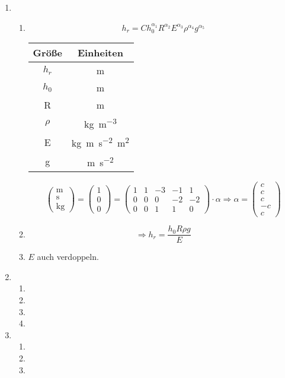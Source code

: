 \documentclass[a4paper,11pt]{scrartcl}
\begin{document}
\begin{enumerate}[label*=\textbf{7.\arabic*.}]
\begin{enumerate}
  \end{enumerate}
  
  \item
  \begin{enumerate}
    \item
    \[ h_r = C h_0^{\alpha_1}
      R^{\alpha_2}E^{\alpha_3}\rho^{\alpha_4}g^{\alpha_5} \]

      \begin{tabular}{c|c}
        Größe & Einheiten \\
        \hline
        $h_r$ & \si{\m} \\
        $h_0$ & \si{\m} \\
        R & \si{m} \\
        $\rho$ & \si{\kg\per\m^3}\\
        E & \si{\kg\m\per\s^2\m^2}\\
        g & \si{\m\per\s^2} \\
      \end{tabular}

    \[\begin{pmatrix}\si{\m}\\\si{\s}\\\si{\kg}\end{pmatrix}
      = \begin{pmatrix}1\\0\\0\end{pmatrix}
      = \begin{pmatrix}1&1&-3&-1&1\\0&0&0&-2&-2\\0&0&1&1&0\end{pmatrix} \cdot \alpha
      \Rightarrow
      \alpha = \begin{pmatrix}c\\c\\c\\-c\\c\end{pmatrix}
    \]

    \item
    \[\Rightarrow h_r = \frac{h_0 R \rho g}{E}\]

    \item
      $E$ auch verdoppeln.

  \end{enumerate}
  \item
  \begin{enumerate}
    \item
    \item
    \item
    \item
  \end{enumerate}
  \item
  \begin{enumerate}
    \item
    \item
    \item
  \end{enumerate}
\end{enumerate}
\end{document}
